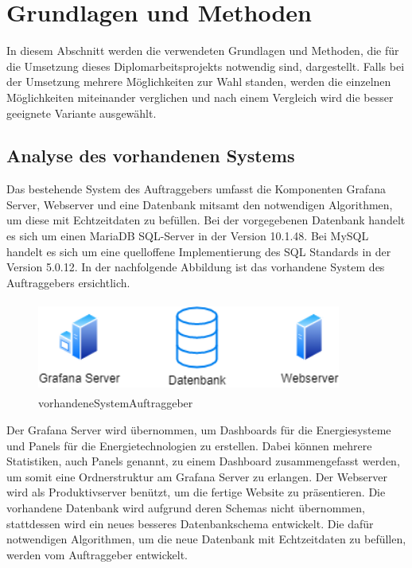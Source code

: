\chapter{Grundlagen und Methoden} 
In diesem Abschnitt werden die verwendeten Grundlagen und Methoden, die für die Umsetzung dieses Diplomarbeitsprojekts notwendig sind, dargestellt. Falls bei der Umsetzung mehrere Möglichkeiten zur Wahl standen, werden die einzelnen Möglichkeiten miteinander verglichen und nach einem Vergleich wird die besser geeignete Variante ausgewählt.


\section{Analyse des vorhandenen Systems}
Das bestehende System des Auftraggebers umfasst die Komponenten Grafana Server, Webserver und eine Datenbank mitsamt den notwendigen Algorithmen, um diese mit Echtzeitdaten zu befüllen. Bei der vorgegebenen Datenbank handelt es sich um einen MariaDB SQL-Server in der Version 10.1.48. Bei MySQL handelt es sich um eine quelloffene Implementierung des SQL Standards in der Version 5.0.12. In der nachfolgende Abbildung ist das vorhandene System des Auftraggebers ersichtlich.
\newline

\begin{figure}[h]
	\centering
	\includegraphics[height=3cm,width=10cm]{images/vorhandeneSystemAuftraggeber}
	\caption{vorhandeneSystemAuftraggeber}
	\label{fig:vorhandeneSystemAuftraggeber}
\end{figure}
Der Grafana Server wird übernommen, um Dashboards für die Energiesysteme und Panels für die Energietechnologien zu erstellen. Dabei können mehrere Statistiken, auch Panels genannt, zu einem Dashboard zusammengefasst werden, um somit eine Ordnerstruktur am Grafana Server zu erlangen. Der Webserver wird als Produktivserver benützt, um die fertige Website zu präsentieren. Die vorhandene Datenbank wird aufgrund deren Schemas nicht übernommen, stattdessen wird ein neues besseres Datenbankschema entwickelt. Die dafür notwendigen Algorithmen, um die neue Datenbank mit Echtzeitdaten zu befüllen, werden vom Auftraggeber entwickelt.



